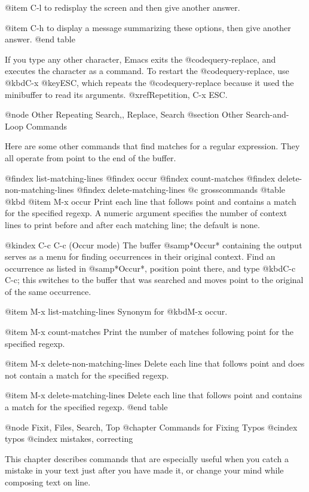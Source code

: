 {{{{{{{{{{{{{{{{@item C-l
to redisplay the screen and then give another answer.

@item C-h
to display a message summarizing these options, then give another
answer.
@end table

  If you type any other character, Emacs exits the @code{query-replace}, and
executes the character as a command.  To restart the @code{query-replace},
use @kbd{C-x @key{ESC}}, which repeats the @code{query-replace} because it
used the minibuffer to read its arguments.  @xref{Repetition, C-x ESC}.

@node Other Repeating Search,, Replace, Search
@section Other Search-and-Loop Commands

  Here are some other commands that find matches for a regular expression.
They all operate from point to the end of the buffer.

@findex list-matching-lines
@findex occur
@findex count-matches
@findex delete-non-matching-lines
@findex delete-matching-lines
@c grosscommands
@table @kbd
@item M-x occur
Print each line that follows point and contains a match for the
specified regexp.  A numeric argument specifies the number of context
lines to print before and after each matching line; the default is
none.

@kindex C-c C-c (Occur mode)
The buffer @samp{*Occur*} containing the output serves as a menu for
finding occurrences in their original context.  Find an occurrence
as listed in @samp{*Occur*}, position point there, and type @kbd{C-c
C-c}; this switches to the buffer that was searched and moves point to
the original of the same occurrence.

@item M-x list-matching-lines
Synonym for @kbd{M-x occur}.

@item M-x count-matches
Print the number of matches following point for the specified regexp.

@item M-x delete-non-matching-lines
Delete each line that follows point and does not contain a match for
the specified regexp.

@item M-x delete-matching-lines
Delete each line that follows point and contains a match for the
specified regexp.
@end table

@node Fixit, Files, Search, Top
@chapter Commands for Fixing Typos
@cindex typos
@cindex mistakes, correcting

  This chapter describes commands that are especially useful when you
catch a mistake in your text just after you have made it, or change your
mind while composing text on line.

}}}}}}}}}}}}}}}}
